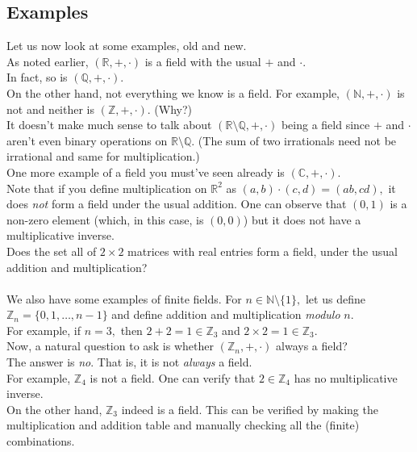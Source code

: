 \documentclass{article}
\begin{document}
\subsection{Examples}
Let us now look at some examples, old and new.\\
As noted earlier, $(\mathbb{R}, +, \cdot)$ is a field with the usual $+$ and $\cdot.$\\
In fact, so is $(\mathbb{Q}, +, \cdot).$\\
On the other hand, not everything we know is a field. For example, $(\mathbb{N}, +, \cdot)$ is not and neither is $(\mathbb{Z}, +, \cdot).$ (Why?)\\
It doesn't make much sense to talk about $(\mathbb{R}\setminus\mathbb{Q}, +, \cdot)$ being a field since $+$ and $\cdot$ aren't even binary operations on $\mathbb{R}\setminus\mathbb{Q}.$ (The sum of two irrationals need not be irrational and same for multiplication.)\\
One more example of a field you must've seen already is $(\mathbb{C}, +, \cdot).$\\
Note that if you define multiplication on $\mathbb{R}^2$ as $(a, b)\cdot(c, d) = (ab, cd),$ it does \emph{not} form a field under the usual addition. One can observe that $(0, 1)$ is a non-zero element (which, in this case, is $(0, 0)$) but it does not have a multiplicative inverse. \\
Does the set all of $2\times2$ matrices with real entries form a field, under the usual addition and multiplication?\\~\\
We also have some examples of finite fields. For $n \in \mathbb{N}\setminus\{1\},$ let us define $\mathbb{Z}_n = \{0, 1, \ldots, n-1\}$ and define addition and multiplication \emph{modulo} $n.$\\
For example, if $n = 3,$ then $2 + 2 = 1 \in \mathbb{Z}_3$ and $2\times 2 = 1 \in \mathbb{Z}_3.$\\
Now, a natural question to ask is whether $(\mathbb{Z}_n, +, \cdot)$ always a field?\\
The answer is \emph{no}. That is, it is not \emph{always} a field.\\
For example, $\mathbb{Z}_4$ is not a field. One can verify that $2 \in \mathbb{Z}_4$ has no multiplicative inverse.\\
On the other hand, $\mathbb{Z}_3$ indeed is a field. This can be verified by making the multiplication and addition table and manually checking all the (finite) combinations.\\
\end{document}
